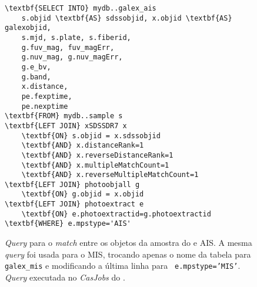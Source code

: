 \begin{figure}
\begin{Verbatim}[commandchars=\\\{\}]
\textbf{SELECT INTO} mydb..galex_ais
	s.objid \textbf{AS} sdssobjid, x.objid \textbf{AS} galexobjid,
	s.mjd, s.plate, s.fiberid,
	g.fuv_mag, fuv_magErr,
	g.nuv_mag, g.nuv_magErr,
	g.e_bv,
	g.band,
	x.distance,
	pe.fexptime,
	pe.nexptime
\textbf{FROM} mydb..sample s
\textbf{LEFT JOIN} xSDSSDR7 x
	\textbf{ON} s.objid = x.sdssobjid
	\textbf{AND} x.distanceRank=1
	\textbf{AND} x.reverseDistanceRank=1
	\textbf{AND} x.multipleMatchCount=1
	\textbf{AND} x.reverseMultipleMatchCount=1
\textbf{LEFT JOIN} photoobjall g
	\textbf{ON} g.objid = x.objid
\textbf{LEFT JOIN} photoextract e
	\textbf{ON} e.photoextractid=g.photoextractid
\textbf{WHERE} e.mpstype='AIS'
\end{Verbatim}
	\caption[{\em Match} entre os objetos da amostra do \starlight e \galex.]
	{{\em Query} para o {\em match} entre os objetos da amostra do \starlight e
	\galex AIS. A mesma {\em query} foi usada para o MIS, trocando apenas o nome da
	tabela para {\tt galex\_mis} e modificando a última linha para {\tt
	e.mpstype='MIS'}. {\em Query} executada no {\em CasJobs} do \galex.}
	\label{fig:QueryMatchAIS}
\end{figure}



